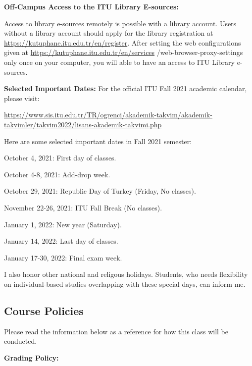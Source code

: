 \documentclass[
  12pt,
]{article}
\begin{document}
\textbf{Off-Campus Access to the ITU Library E-sources:}

Access to library e-sources remotely is possible with a library account.
Users without a library account should apply for the library
registration at \url{https://kutuphane.itu.edu.tr/en/register}. After
setting the web configurations given at
\url{https://kutuphane.itu.edu.tr/en/services}
/web-browser-proxy-settings only once on your computer, you will able to
have an access to ITU Library e-sources.

\textbf{Selected Important Dates:} For the official ITU Fall 2021
academic calendar, please visit:

\url{https://www.sis.itu.edu.tr/TR/ogrenci/akademik-takvim/akademik-takvimler/takvim2022/lisans-akademik-takvimi.php}

Here are some selected important dates in Fall 2021 semester:

October 4, 2021: First day of classes.

October 4-8, 2021: Add-drop week.

October 29, 2021: Republic Day of Turkey (Friday, No classes).

November 22-26, 2021: ITU Fall Break (No classes).

January 1, 2022: New year (Saturday).

January 14, 2022: Last day of classes.

January 17-30, 2022: Final exam week.

I also honor other national and religous holidays. Students, who needs
flexibility on individual-based studies overlapping with these special
days, can inform me.

\hypertarget{course-policies}{%
\subsection{Course Policies}\label{course-policies}}

Please read the information below as a reference for how this class will
be conducted.

\textbf{Grading Policy:}
\end{document}
